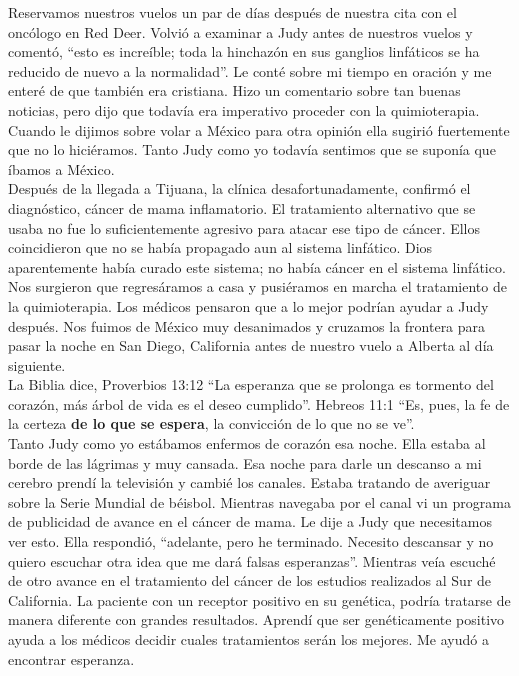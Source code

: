\documentclass[twoside, 12pt]{book}
\begin{document}
Reservamos nuestros vuelos un par de días después de nuestra cita con el oncólogo en Red Deer. Volvió a examinar a Judy antes de nuestros vuelos y comentó, “esto es increíble; toda la hinchazón en sus ganglios linfáticos se ha reducido de nuevo a la normalidad”. Le conté sobre mi tiempo en oración y me enteré de que también era cristiana. Hizo un comentario sobre tan buenas noticias, pero dijo que todavía era imperativo proceder con la quimioterapia. Cuando le dijimos sobre volar a México para otra opinión ella sugirió fuertemente que no lo hiciéramos. Tanto Judy como yo todavía sentimos que se suponía que íbamos a México.\\

Después de la llegada a Tijuana, la clínica desafortunadamente, confirmó el diagnóstico, cáncer de mama inflamatorio.  El tratamiento alternativo que se usaba no fue lo suficientemente agresivo para atacar ese tipo de cáncer.  Ellos coincidieron que no se había propagado aun al sistema linfático.  Dios aparentemente había curado este sistema; no había cáncer en el sistema linfático. Nos surgieron que regresáramos a casa y pusiéramos en marcha el tratamiento de la quimioterapia.  Los médicos pensaron que a lo mejor podrían ayudar a Judy después.  Nos fuimos de México muy desanimados y cruzamos la frontera para pasar la noche en San Diego, California antes de nuestro vuelo a Alberta al día siguiente.\\

La Biblia dice, Proverbios 13:12 “La esperanza que se prolonga es tormento del corazón, más árbol de vida es el deseo cumplido”.   Hebreos 11:1 “Es, pues, la fe de la certeza \textbf{de lo que se espera}, la convicción de lo que no se ve”.\\

Tanto Judy como yo estábamos enfermos de corazón esa noche. Ella estaba al borde de las lágrimas y muy cansada. Esa noche para darle un descanso a mi cerebro prendí la televisión y cambié los canales. Estaba tratando de averiguar sobre la Serie Mundial de béisbol. Mientras navegaba por el canal vi un programa de publicidad de avance en el cáncer de mama. Le dije a Judy que necesitamos ver esto. Ella respondió, “adelante, pero he terminado. Necesito descansar y no quiero escuchar otra idea que me dará falsas esperanzas”. Mientras veía escuché de otro avance en el tratamiento del cáncer de los estudios realizados al Sur de California. La paciente con un receptor positivo en su genética, podría tratarse de manera diferente con grandes resultados. Aprendí que ser genéticamente positivo ayuda a los médicos decidir cuales tratamientos serán los mejores. Me ayudó a encontrar esperanza.\\
\end{document}
